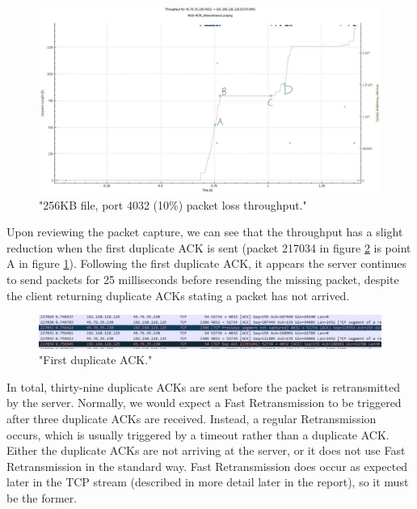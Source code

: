\documentclass[12pt]{article}
\begin{document}
\begin{figure}[!htbp]
  \centering
  \includegraphics[scale=0.3]{4032_256KB_throughput-marked-points.jpg}
  \caption{"256KB file, port 4032 (10\%) packet loss throughput."}
  \label{figure1: 4032:256KB Throughput}
\end{figure}

Upon reviewing the packet capture, we can see that the throughput has a slight reduction when the first duplicate ACK is sent (packet 217034 in figure \ref{figure2: first duplicate ACK} is point A in figure \ref{figure1: 4032:256KB Throughput}).
Following the first duplicate ACK, it appears the server continues to send packets for 25 milliseconds before resending the missing packet, despite the client returning duplicate ACKs stating a packet has not arrived.

\begin{figure}[!htbp]
  \centering
  \includegraphics[width=\linewidth]{4032-256KB-duplicate-ack.PNG}
  \caption{"First duplicate ACK."}
  \label{figure2: first duplicate ACK}
\end{figure}

In total, thirty-nine duplicate ACKs are sent before the packet is retransmitted by the server.
Normally, we would expect a Fast Retransmission to be triggered after three duplicate ACKs are received.
Instead, a regular Retransmission occurs, which is usually triggered by a timeout rather than a duplicate ACK.
Either the duplicate ACKs are not arriving at the server, or it does not use Fast Retransmission in the standard way.
Fast Retransmission does occur as expected later in the TCP stream (described in more detail later in the report), so it must be the former.
\end{document}
